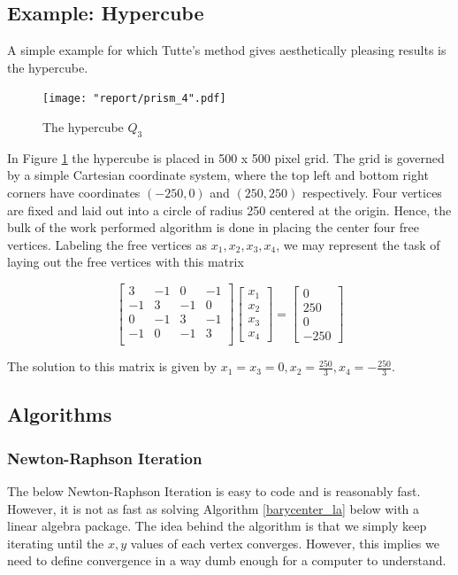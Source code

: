 \documentclass[11pt]{report}
\begin{document}
\subsection{Example: Hypercube}
A simple example for which Tutte's method gives aesthetically pleasing results is the hypercube.

\begin{figure}[H]\label{fig:hypercube}
    \centering
    \texttt{[image: "report/prism\_4".pdf]}
    \caption{The hypercube $Q_3$}
\end{figure}

In Figure \ref{fig:hypercube} the hypercube is placed in 500 x 500 pixel grid. The grid is governed by a simple Cartesian coordinate system, where the top left and bottom right corners have coordinates $(-250, 0)$ and $(250, 250)$ respectively. Four vertices are fixed and laid out into a circle of radius 250 centered at the origin. Hence, the bulk of the work performed algorithm is done in placing the center four free vertices. Labeling the free vertices as $x_1, x_2, x_3, x_4$, we may represent the task of laying out the free vertices with this matrix

\[
\begin{bmatrix}
    3 & -1 & 0 & -1 \\
    -1 & 3 & -1 & 0 \\
    0 & -1 & 3 & -1 \\
    -1 & 0 & -1 & 3 \\
\end{bmatrix}
\begin{bmatrix} x_1 \\ x_2 \\ x_3 \\ x_4 \end{bmatrix} =
\begin{bmatrix} 0 \\ 250 \\ 0 \\ -250 \end{bmatrix}
\]

The solution to this matrix is given by $x_1 = x_3 = 0, x_2 = \frac{250}{3}, x_4 = -\frac{250}{3}$.

\subsection{Algorithms}
\subsubsection{Newton-Raphson Iteration}
The below Newton-Raphson Iteration is easy to code and is reasonably fast. However, it is not as fast as solving Algorithm \ref{barycenter_la} below with a linear algebra package. The idea behind the algorithm is that we simply keep iterating until the $x, y$ values of each vertex converges. However, this implies we need to define convergence in a way dumb enough for a computer to understand.
\end{document}
